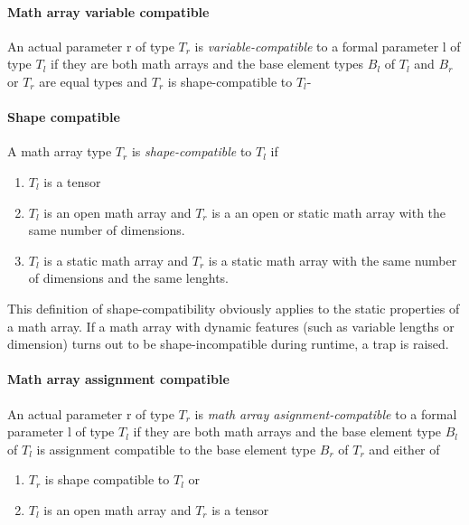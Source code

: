\documentclass[a4wide,11pt]{article}
\begin{document}
\paragraph{Math array variable compatible} An actual parameter r of type $T_r$ is \emph{variable-compatible} to a formal parameter l of type $T_l$ if they are both math arrays and the base element types $B_l$ of $T_l$ and $B_r$ or $T_r$ are equal types and $T_r$ is shape-compatible to $T_l$-

\paragraph{Shape compatible} A math array type $T_r$ is \emph{shape-compatible} to $T_l$ if
\begin{enumerate}
\item $T_l$ is a tensor
\item $T_l$ is an open math array and $T_r$ is a an open or static math array with the same number of dimensions.
\item $T_l$ is a static math array and $T_r$ is a static math array with the same number of dimensions and the same lenghts.
\end{enumerate}

This definition of shape-compatibility obviously applies to the static properties of a math array.
If a math array with dynamic features (such as variable lengths or dimension) turns out to be  shape-incompatible during runtime, a trap is raised.

\paragraph{Math array assignment compatible} An actual parameter r of type $T_r$ is \emph{math array asignment-compatible} to a formal parameter l of type $T_l$ if they are both math arrays and the base element type $B_l$ of $T_l$ is assignment compatible to the base element type $B_r$ of $T_r$ and either of
\begin{enumerate}
\item $T_r$ is shape compatible to $T_l$ or
\item $T_l$ is an open math array and $T_r$ is a tensor
\end{enumerate}
\end{document}
